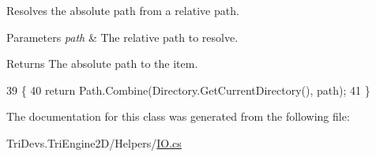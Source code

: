 Resolves the absolute path from a relative path. 


\begin{DoxyParams}{Parameters}
{\em path} & The relative path to resolve.\\
\hline
\end{DoxyParams}
\begin{DoxyReturn}{Returns}
The absolute path to the item.
\end{DoxyReturn}

\begin{DoxyCode}
39         \{
40             \textcolor{keywordflow}{return} Path.Combine(Directory.GetCurrentDirectory(), path);
41         \}
\end{DoxyCode}


The documentation for this class was generated from the following file\-:\begin{DoxyCompactItemize}
\item 
Tri\-Devs.\-Tri\-Engine2\-D/\-Helpers/\hyperlink{_i_o_8cs}{I\-O.\-cs}\end{DoxyCompactItemize}
